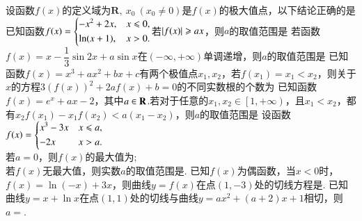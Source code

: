 \documentclass{BHCexam}
\begin{document}
\begin{questions}
\qs 设函数$f(x)$的定义域为$ \mathbf{R} ,~x_0~(x_0\ne 0)$是$f(x)$的极大值点，以下结论正确的是\xx
{}
\question
已知函数$f(x)=\begin{dcases}
-x^2+2x,&x\le0,\\
\ln(x+1),&x>0.
\end{dcases}$若$\abs{f(x)}\ge ax$，则$a$的取值范围是\xx
\onech{$\left(-\infty,0\right]$}{$\left(-\infty,1\right]$}{$\left[-2,-1\right]$}{$\left[-2,0\right]$}
\question
若函数$f(x)=x-\dfrac{1}{3}\sin 2x+a\sin x$在$(-\infty,+\infty)$单调递增，则$a$的取值范围是\xx
{}
\qs 已知函数$f(x)=x^3+ax^2+bx+c$有两个极值点$x_1,x_2$，若$f(x_1)=x_1<x_2$，则关于$x$的方程$3(f(x))^2+2af(x)+b=0$的不同实数根的个数为\xx
{}
\qs 已知函数$f(x)=e^x+ax-2$，其中$ a\inR $.若对于任意的$ x_1,x_2\in\left[1,+\infty\right) $，且$ x_1<x_2 $，都有$ x_2f(x_1)-x_1f(x_2)<a(x_1-x_2) $，则$ a $的取值范围是\xx
{}
\question
设函数
$f(x)=\begin{dcases}
x^3-3x &x\le a,\\
-2x &x>a.
\end{dcases}$\\
若$a=0$，则$f(x)$的最大值为\tk;\\
若$f(x)$无最大值，则实数$a$的取值范围是\tk.
\question
已知$f(x)$为偶函数，当$x<0$时，$f(x)=\ln \left(-x\right)+3x$，则曲线$y=f(x)$在点$(1,-3)$处的切线方程是\tk.
\qs 已知曲线$y=x+\ln x$在点$(1,1)$处的切线与曲线$y=ax^2+(a+2)x+1$相切，则$a=$\tk.
\end{questions}
\end{document}
